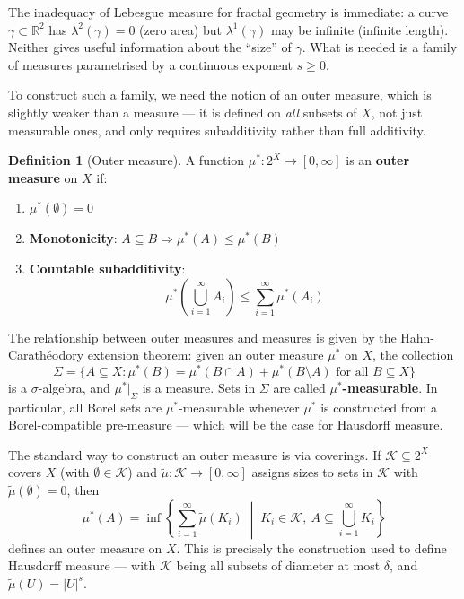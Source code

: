 \documentclass[11pt, a4paper]{article}
\theoremstyle{plain}
\theoremstyle{definition}
\newtheorem{definition}[theorem]{Definition}
\theoremstyle{remark}
\newcommand{\R}{\mathbb{R}}
\begin{document}
The inadequacy of Lebesgue measure for fractal geometry is immediate: a curve 
$\gamma \subset \R^2$ has $\lambda^2(\gamma) = 0$ (zero area) but $\lambda^1(\gamma)$ 
may be infinite (infinite length). Neither gives useful information about the 
``size'' of $\gamma$. What is needed is a family of measures parametrised by a 
continuous exponent $s \geq 0$.

To construct such a family, we need the notion of an outer measure, which is 
slightly weaker than a measure --- it is defined on \emph{all} subsets of $X$, 
not just measurable ones, and only requires subadditivity rather than full 
additivity.

\begin{definition}[Outer measure]
  A function $\mu^* : 2^X \to [0, \infty]$ is an \textbf{outer measure} on $X$ if:
  \begin{enumerate}
    \item $\mu^*(\emptyset) = 0$
    \item \textbf{Monotonicity}: $A \subseteq B \Rightarrow \mu^*(A) \leq \mu^*(B)$
    \item \textbf{Countable subadditivity}:
    \[
      \mu^*\!\left(\bigcup_{i=1}^{\infty} A_i\right) 
      \leq \sum_{i=1}^{\infty} \mu^*(A_i)
    \]
  \end{enumerate}
\end{definition}

The relationship between outer measures and measures is given by the
Hahn-Carath\'{e}odory extension theorem: given an outer measure $\mu^*$ on $X$, the collection
\[
  \Sigma = \{A \subseteq X : \mu^*(B) = \mu^*(B \cap A) + \mu^*(B \setminus A) 
  \text{ for all } B \subseteq X\}
\]
is a $\sigma$-algebra, and $\mu^*|_{\Sigma}$ is a measure. Sets in 
$\Sigma$ are called \textbf{$\mu^*$-measurable}. In particular, all Borel sets  
are $\mu^*$-measurable whenever $\mu^*$ is constructed from a Borel-compatible 
pre-measure --- which will be the case for Hausdorff measure.

The standard way to construct an outer measure is via coverings. If 
$\mathcal{K} \subseteq 2^X$ covers $X$ (with $\emptyset \in \mathcal{K}$) and 
$\tilde{\mu} : \mathcal{K} \to [0, \infty]$ assigns sizes to sets in $\mathcal{K}$ 
with $\tilde{\mu}(\emptyset) = 0$, then
\[
  \mu^*(A) = \inf\left\{
    \sum_{i=1}^{\infty} \tilde{\mu}(K_i) 
    \;\middle|\; 
    K_i \in \mathcal{K},\ A \subseteq \bigcup_{i=1}^{\infty} K_i
  \right\}
\]
defines an outer measure on $X$. This is precisely the construction used to 
define Hausdorff measure --- with $\mathcal{K}$ being all subsets of diameter 
at most $\delta$, and $\tilde{\mu}(U) = |U|^s$.
\newpage
\end{document}
